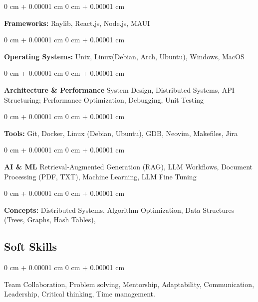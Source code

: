 \documentclass[10pt, letterpaper]{article}
\newenvironment{onecolentry}{
    \begin{adjustwidth}{
        0 cm + 0.00001 cm
    }{
        0 cm + 0.00001 cm
    }
}{
    \end{adjustwidth}
} %
\begin{document}
        \vspace{0.1 cm}
        
        \begin{onecolentry}
            \textbf{Frameworks:} Raylib, React.js, Node.js, MAUI
        \end{onecolentry}
        
        \vspace{0.1 cm}
        
        \begin{onecolentry}
            \textbf{Operating Systems:} Unix, Linux(Debian, Arch, Ubuntu), Windows, MacOS
        \end{onecolentry}
        
        \vspace{0.1 cm}
        
        \begin{onecolentry}
            \textbf{Architecture \& Performance} System Design, Distributed Systems, API Structuring; Performance Optimization, Debugging, Unit Testing
        \end{onecolentry}
        
        \vspace{0.1 cm}
        
        \begin{onecolentry}
            \textbf{Tools:} Git, Docker, Linux (Debian, Ubuntu), GDB, Neovim, Makefiles, Jira
        \end{onecolentry}
        
        \vspace{0.1 cm}
        
        \begin{onecolentry}
            \textbf{AI \& ML} Retrieval-Augmented Generation (RAG), LLM Workflows, Document Processing (PDF, TXT), Machine Learning, LLM Fine Tuning
        \end{onecolentry}
        
        \vspace{0.1 cm}
        
        \begin{onecolentry}
            \textbf{Concepts:} Distributed Systems, Algorithm Optimization, Data Structures (Trees, Graphs, Hash Tables),
        \end{onecolentry}
        
        \subsection{Soft Skills}
        \begin{onecolentry}
            Team Collaboration, Problem solving, Mentorship, Adaptability, Communication, Leadership, Critical thinking, Time management.
        \end{onecolentry}
\end{document}
